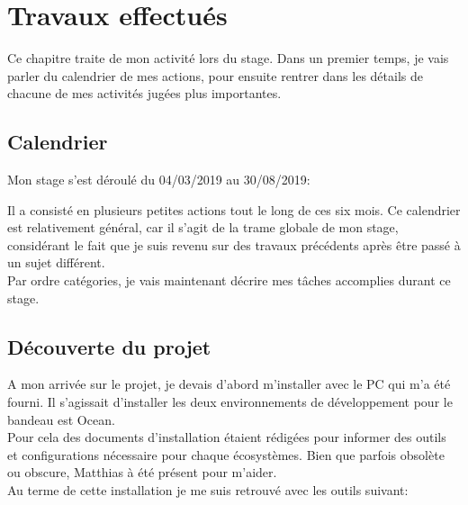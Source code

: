 \documentclass{rapport}
\begin{document}
\newpage

\section{Travaux effectués}

Ce chapitre traite de mon activité lors du stage. Dans un premier temps, je vais parler du calendrier de mes actions, pour ensuite rentrer dans les détails de chacune de mes activités jugées plus importantes.

\subsection{Calendrier}

Mon stage s'est déroulé du 04/03/2019 au 30/08/2019:\\


Il a consisté en plusieurs petites actions tout le long de ces six mois. Ce calendrier est relativement général, car il s'agit de la trame globale de mon stage, considérant le fait  que je suis revenu sur des travaux précédents après être passé à un sujet différent.\\

Par ordre catégories, je vais maintenant décrire mes tâches accomplies durant ce stage. 

\newpage
\subsection{Découverte du projet}

A mon arrivée sur le projet, je devais d'abord m'installer avec le PC qui m'a été fourni. Il s'agissait d'installer les deux environnements de développement pour le bandeau est Ocean.\\
Pour cela des documents d'installation étaient rédigées pour informer des outils et configurations nécessaire pour chaque écosystèmes. Bien que parfois obsolète ou obscure, Matthias à été présent pour m'aider.\\

Au terme de cette installation je me suis retrouvé avec les outils suivant:\\
\end{document}
